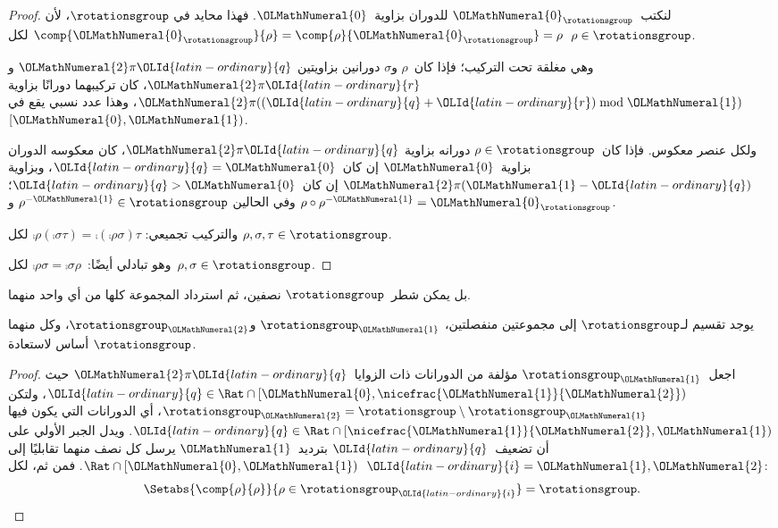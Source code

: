\documentclass[../../../include/open-logic-section]{subfiles}
\begin{document}
\begin{proof}
لنكتب~$\OLMathNumeral{0}_{\rotationsgroup}$ للدوران بزاوية~$\OLMathNumeral{0}$. فهذا محايد في
$\rotationsgroup$، لأن
$\comp{\OLMathNumeral{0}_{\rotationsgroup}}{\rho} = \comp{\rho}{\OLMathNumeral{0}_{\rotationsgroup}} =
\rho$ لكل~$\rho \in \rotationsgroup$.

وهي مغلقة تحت التركيب؛ فإذا كان~$\rho$ و$\sigma$ دورانين بزاويتين
$\OLMathNumeral{2}\pi \OLId{latin-ordinary}{q}$ و$\OLMathNumeral{2}\pi \OLId{latin-ordinary}{r}$، كان تركيبهما دورانًا بزاوية
$\OLMathNumeral{2}\pi((\OLId{latin-ordinary}{q}+\OLId{latin-ordinary}{r}) \bmod \OLMathNumeral{1})$، وهذا عدد نسبي يقع في~$[\OLMathNumeral{0},\OLMathNumeral{1})$.

ولكل عنصر معكوس. فإذا كان~$\rho \in \rotationsgroup$ دورانه بزاوية
$\OLMathNumeral{2}\pi \OLId{latin-ordinary}{q}$، كان معكوسه الدوران بزاوية~$\OLMathNumeral{0}$ إن كان~$\OLId{latin-ordinary}{q}=\OLMathNumeral{0}$، وبزاوية
$\OLMathNumeral{2}\pi(\OLMathNumeral{1}-\OLId{latin-ordinary}{q})$ إن كان~$\OLId{latin-ordinary}{q}>\OLMathNumeral{0}$؛ وفي الحالين
$\rho^{-\OLMathNumeral{1}} \in \rotationsgroup$ و
$\rho \circ \rho^{-\OLMathNumeral{1}} = \OLMathNumeral{0}_\rotationsgroup$.

والتركيب تجميعي:
$\comp{\rho}{(\comp{\sigma}{\tau})} =
\comp{(\comp{\rho}{\sigma})}{\tau}$ لكل
$\rho, \sigma, \tau \in \rotationsgroup$.

وهو تبادلي أيضًا:~$\comp{\rho}{\sigma} =
\comp{\sigma}{\rho}$ لكل~$\rho, \sigma \in \rotationsgroup$.
\end{proof}

بل يمكن شطر~$\rotationsgroup$ نصفين، ثم استرداد المجموعة كلها من أي
واحد منهما.

\begin{lem}
يوجد تقسيم لـ$\rotationsgroup$ إلى مجموعتين منفصلتين،
$\rotationsgroup_{\OLMathNumeral{1}}$ و$\rotationsgroup_{\OLMathNumeral{2}}$، وكل منهما أساس لاستعادة
$\rotationsgroup$.
\end{lem}

\begin{proof}
اجعل~$\rotationsgroup_{\OLMathNumeral{1}}$ مؤلفة من الدورانات ذات الزوايا~$\OLMathNumeral{2}\pi \OLId{latin-ordinary}{q}$ حيث
$\OLId{latin-ordinary}{q} \in \Rat \cap [\OLMathNumeral{0},\nicefrac{\OLMathNumeral{1}}{\OLMathNumeral{2}})$، ولتكن
$\rotationsgroup_{\OLMathNumeral{2}} = \rotationsgroup \setminus
\rotationsgroup_\OLMathNumeral{1}$، أي الدورانات التي يكون فيها
$\OLId{latin-ordinary}{q} \in \Rat \cap [\nicefrac{\OLMathNumeral{1}}{\OLMathNumeral{2}},\OLMathNumeral{1})$. ويدل الجبر الأولي على أن
تضعيف~$\OLId{latin-ordinary}{q}$ بترديد~$\OLMathNumeral{1}$ يرسل كل نصف منهما تقابليًا إلى
$\Rat \cap [\OLMathNumeral{0},\OLMathNumeral{1})$. فمن ثم، لكل~$\OLId{latin-ordinary}{i}=\OLMathNumeral{1},\OLMathNumeral{2}$:
\[
	\Setabs{\comp{\rho}{\rho}}{\rho \in \rotationsgroup_\OLId{latin-ordinary}{i}} =
	\rotationsgroup.
\]
\end{proof}
\end{document}
